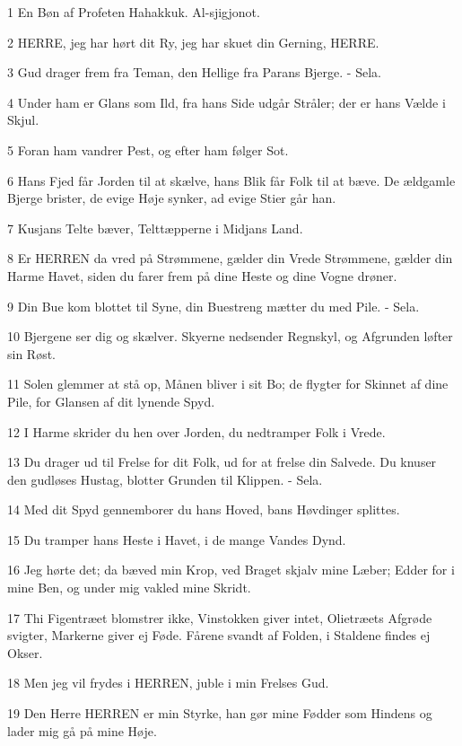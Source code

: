 \par 1 En Bøn af Profeten Hahakkuk. Al-sjigjonot.
\par 2 HERRE, jeg har hørt dit Ry, jeg har skuet din Gerning, HERRE.
\par 3 Gud drager frem fra Teman, den Hellige fra Parans Bjerge. - Sela.
\par 4 Under ham er Glans som Ild, fra hans Side udgår Stråler; der er hans Vælde i Skjul.
\par 5 Foran ham vandrer Pest, og efter ham følger Sot.
\par 6 Hans Fjed får Jorden til at skælve, hans Blik får Folk til at bæve. De ældgamle Bjerge brister, de evige Høje synker, ad evige Stier går han.
\par 7 Kusjans Telte bæver, Telttæpperne i Midjans Land.
\par 8 Er HERREN da vred på Strømmene, gælder din Vrede Strømmene, gælder din Harme Havet, siden du farer frem på dine Heste og dine Vogne drøner.
\par 9 Din Bue kom blottet til Syne, din Buestreng mætter du med Pile. - Sela.
\par 10 Bjergene ser dig og skælver. Skyerne nedsender Regnskyl, og Afgrunden løfter sin Røst.
\par 11 Solen glemmer at stå op, Månen bliver i sit Bo; de flygter for Skinnet af dine Pile, for Glansen af dit lynende Spyd.
\par 12 I Harme skrider du hen over Jorden, du nedtramper Folk i Vrede.
\par 13 Du drager ud til Frelse for dit Folk, ud for at frelse din Salvede. Du knuser den gudløses Hustag, blotter Grunden til Klippen. - Sela.
\par 14 Med dit Spyd gennemborer du hans Hoved, bans Høvdinger splittes.
\par 15 Du tramper hans Heste i Havet, i de mange Vandes Dynd.
\par 16 Jeg hørte det; da bæved min Krop, ved Braget skjalv mine Læber; Edder for i mine Ben, og under mig vakled mine Skridt.
\par 17 Thi Figentræet blomstrer ikke, Vinstokken giver intet, Olietræets Afgrøde svigter, Markerne giver ej Føde. Fårene svandt af Folden, i Staldene findes ej Okser.
\par 18 Men jeg vil frydes i HERREN, juble i min Frelses Gud.
\par 19 Den Herre HERREN er min Styrke, han gør mine Fødder som Hindens og lader mig gå på mine Høje.


